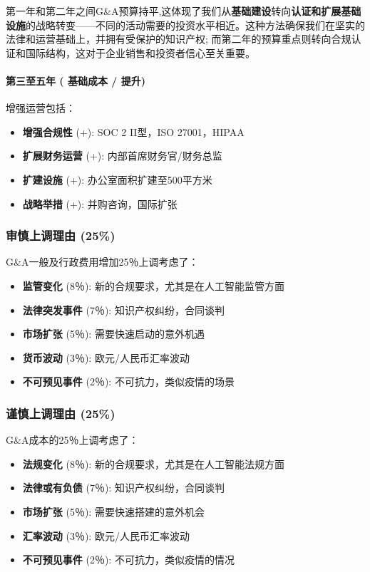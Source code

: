\documentclass[11点, A4纸, 单面]{article}
\begin{document}
第一年和第二年之间G\&A预算持平,这体现了我们从\textbf{基础建设}转向\textbf{认证和扩展基础设施}的战略转变——不同的活动需要的投资水平相近。这种方法确保我们在坚实的法律和运营基础上，并拥有受保护的知识产权; 而第二年的预算重点则转向合规认证和国际结构，这对于企业销售和投资者信心至关重要。

\paragraph{第三至五年 ( 基础成本 /  提升)}
增强运营包括：
\begin{itemize}
    \item \textbf{增强合规性} (+): SOC 2 II型，ISO 27001，HIPAA
    \item \textbf{扩展财务运营} (+): 内部首席财务官/财务总监
    \item \textbf{扩建设施} (+): 办公室面积扩建至500平方米
    \item \textbf{战略举措} (+): 并购咨询，国际扩张
\end{itemize}

\subsubsection{审慎上调理由 (25\%)}
G\&A一般及行政费用增加25％上调考虑了：
\begin{itemize}
    \item \textbf{监管变化} (8％): 新的合规要求，尤其是在人工智能监管方面
    \item \textbf{法律突发事件} (7％): 知识产权纠纷，合同谈判
    \item \textbf{市场扩张} (5％): 需要快速启动的意外机遇
    \item \textbf{货币波动} (3％): 欧元/人民币汇率波动
    \item \textbf{不可预见事件} (2％): 不可抗力，类似疫情的场景
\end{itemize}
\subsubsection{谨慎上调理由 (25\%)}
G\&A成本的25％上调考虑了：
\begin{itemize}
    \item \textbf{法规变化} (8％): 新的合规要求，尤其是在人工智能法规方面
    \item \textbf{法律或有负债} (7％): 知识产权纠纷，合同谈判
    \item \textbf{市场扩张} (5％): 需要快速搭建的意外机会
    \item \textbf{汇率波动} (3％): 欧元/人民币汇率波动
    \item \textbf{不可预见事件} (2％): 不可抗力，类似疫情的情况
\end{itemize}
\end{document}
